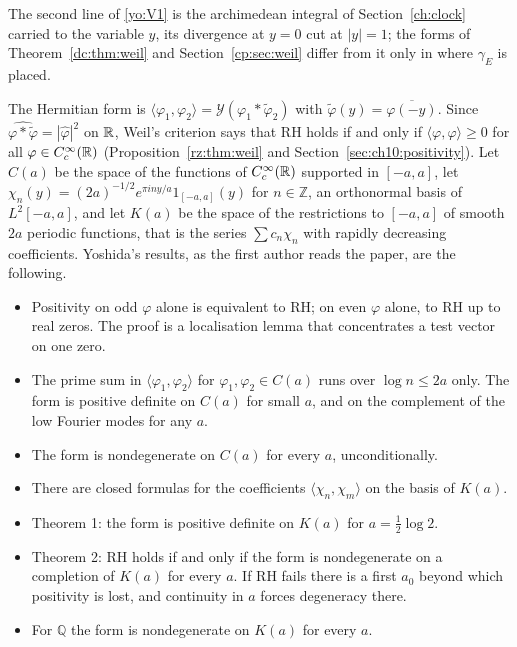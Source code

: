 \begin{remark}\label{yo:rem:V1}
The second line of \eqref{yo:V1} is the archimedean integral of Section~\ref{ch:clock} carried to the variable $y$, its divergence at $y=0$ cut at $|y|=1$; the forms of Theorem~\ref{dc:thm:weil} and Section~\ref{cp:sec:weil} differ from it only in where $\gamma_E$ is placed.
\end{remark}

The Hermitian form is $\langle\varphi_1,\varphi_2\rangle=\mathcal Y(\varphi_1*\widetilde\varphi_2)$ with $\widetilde\varphi(y)=\overline{\varphi(-y)}$. Since $\widehat{\varphi*\widetilde\varphi}=|\widehat\varphi|^2$ on $\mathbb{R}$, Weil's criterion \cite{Weil52,Bombieri} says that RH holds if and only if $\langle\varphi,\varphi\rangle\ge0$ for all $\varphi\in C_c^\infty(\mathbb{R})$ (Proposition~\ref{rz:thm:weil} and Section~\ref{sec:ch10:positivity}). Let $C(a)$ be the space of the functions of $C_c^\infty(\mathbb{R})$ supported in $[-a,a]$, let $\chi_n(y)=(2a)^{-1/2}e^{\pi iny/a}1_{[-a,a]}(y)$ for $n\in\mathbb Z$, an orthonormal basis of $L^2[-a,a]$, and let $K(a)$ be the space of the restrictions to $[-a,a]$ of smooth $2a$ periodic functions, that is the series $\sum c_n\chi_n$ with rapidly decreasing coefficients. Yoshida's results, as the first author reads the paper, are the following.

\begin{itemize}
\item[(Y1)] Positivity on odd $\varphi$ alone is equivalent to RH; on even $\varphi$ alone, to RH up to real zeros. The proof is a localisation lemma that concentrates a test vector on one zero.
\item[(Y2)] The prime sum in $\langle\varphi_1,\varphi_2\rangle$ for $\varphi_1,\varphi_2\in C(a)$ runs over $\log n\le2a$ only. The form is positive definite on $C(a)$ for small $a$, and on the complement of the low Fourier modes for any $a$.
\item[(Y3)] The form is nondegenerate on $C(a)$ for every $a$, unconditionally.
\item[(Y4)] There are closed formulas for the coefficients $\langle\chi_n,\chi_m\rangle$ on the basis of $K(a)$.
\item[(Y5)] Theorem 1: the form is positive definite on $K(a)$ for $a=\frac12\log2$.
\item[(Y6)] Theorem 2: RH holds if and only if the form is nondegenerate on a completion of $K(a)$ for every $a$. If RH fails there is a first $a_0$ beyond which positivity is lost, and continuity in $a$ forces degeneracy there.
\item[(Y7)] For $\mathbb Q$ the form is nondegenerate on $K(a)$ for every $a$.
\end{itemize}

